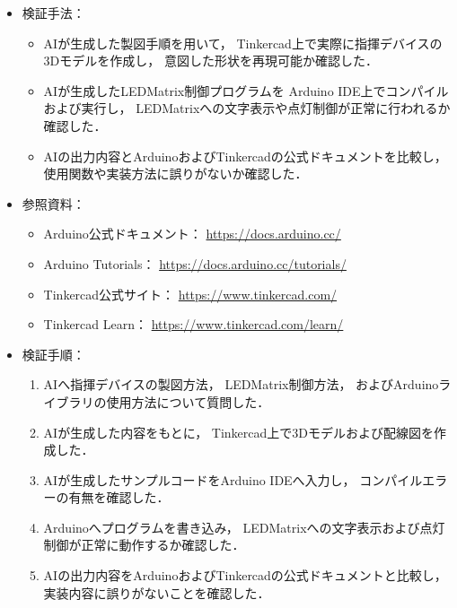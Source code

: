 \documentclass[uplatex,dvipdfmx,a4paper,11pt]{jsarticle}
\begin{document}
\begin{itemize}

    \item 検証手法：
      \begin{itemize}
        \item AIが生成した製図手順を用いて，
        Tinkercad上で実際に指揮デバイスの3Dモデルを作成し，
        意図した形状を再現可能か確認した．
  
        \item AIが生成したLEDMatrix制御プログラムを
        Arduino IDE上でコンパイルおよび実行し，
        LEDMatrixへの文字表示や点灯制御が正常に行われるか確認した．
  
        \item AIの出力内容とArduinoおよびTinkercadの公式ドキュメントを比較し，
        使用関数や実装方法に誤りがないか確認した．
      \end{itemize}

      \item 参照資料：
      \begin{itemize}
        \item Arduino公式ドキュメント：
        \url{https://docs.arduino.cc/}
  
        \item Arduino Tutorials：
        \url{https://docs.arduino.cc/tutorials/}
  
        \item Tinkercad公式サイト：
        \url{https://www.tinkercad.com/}
  
        \item Tinkercad Learn：
        \url{https://www.tinkercad.com/learn/}
      \end{itemize}

      \item 検証手順：
    \begin{enumerate}
      \item AIへ指揮デバイスの製図方法，
      LEDMatrix制御方法，
      およびArduinoライブラリの使用方法について質問した．

      \item AIが生成した内容をもとに，
      Tinkercad上で3Dモデルおよび配線図を作成した．

      \item AIが生成したサンプルコードをArduino IDEへ入力し，
      コンパイルエラーの有無を確認した．

      \item Arduinoへプログラムを書き込み，
      LEDMatrixへの文字表示および点灯制御が正常に動作するか確認した．

      \item AIの出力内容をArduinoおよびTinkercadの公式ドキュメントと比較し，
      実装内容に誤りがないことを確認した．
    \end{enumerate}

\end{itemize}
\end{document}
